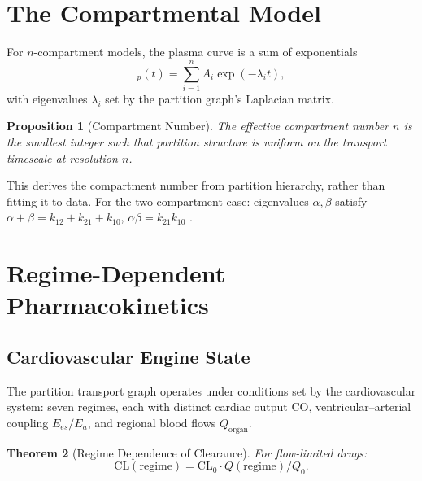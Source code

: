 \documentclass[twocolumn,10pt,a4paper]{article}
\newtheorem{theorem}{Theorem}[section]
\newtheorem{proposition}[theorem]{Proposition}
\theoremstyle{definition}
\theoremstyle{remark}
\begin{document}
\section{The Compartmental Model}

For $n$-compartment models, the plasma curve is a sum of exponentials
\begin{equation}
    [D]_p(t) = \sum_{i=1}^{n}A_i\exp(-\lambda_i t),
\end{equation}
with eigenvalues $\lambda_i$ set by the partition graph's Laplacian matrix.

\begin{proposition}[Compartment Number]
The effective compartment number $n$ is the smallest integer such that partition structure is uniform on the transport timescale at resolution $n$.
\end{proposition}

This derives the compartment number from partition hierarchy, rather than fitting it to data. For the two-compartment case: eigenvalues $\alpha,\beta$ satisfy $\alpha+\beta = k_{12}+k_{21}+k_{10}$, $\alpha\beta = k_{21}k_{10}$ \citep[Wagner relations,][]{wagner_1976,gibaldi_perrier_1982}.

\section{Regime-Dependent Pharmacokinetics}

\subsection{Cardiovascular Engine State}

The partition transport graph operates under conditions set by the cardiovascular system: seven regimes, each with distinct cardiac output $\mathrm{CO}$, ventricular--arterial coupling $E_{es}/E_a$, and regional blood flows $Q_{\mathrm{organ}}$.

\begin{theorem}[Regime Dependence of Clearance]
For flow-limited drugs:
\begin{equation}
    \mathrm{CL}(\mathrm{regime}) = \mathrm{CL}_0\cdot Q(\mathrm{regime})/Q_0.
\end{equation}
\end{theorem}
\end{document}
